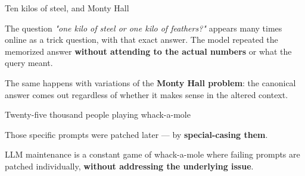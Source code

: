 \documentclass[aspectratio=169,11pt,t]{beamer}
\begin{document}
\begin{frame}[shrink=25]{Ten kilos of steel, and Monty Hall}
\begin{iquote}
\end{iquote}
{\fontsize{9.4}{12.6}\selectfont\color{fg2}The question \textit{"one kilo of steel or one kilo of feathers?"} appears many times online as a trick question, with that exact answer. The model repeated the memorized answer \textbf{without attending to the actual numbers} or what the query meant.\par}\vskip 4pt
{\fontsize{9.4}{12.6}\selectfont\color{fg2}The same happens with variations of the \textbf{Monty Hall problem}: the canonical answer comes out regardless of whether it makes sense in the altered context.\par}\vskip 4pt
\end{frame}

\begin{frame}[shrink=25]{Twenty-five thousand people playing whack-a-mole}
{\fontsize{9.4}{12.6}\selectfont\color{fg2}Those specific prompts were patched later --- by \textbf{special-casing them}.\par}\vskip 4pt
\begin{minipage}[t]{0.494\textwidth}
\end{minipage}%
\hfill
\begin{minipage}[t]{0.494\textwidth}
\end{minipage}%
\begin{iband}[rose]
LLM maintenance is a constant game of whack-a-mole where failing prompts are patched individually, \textbf{without addressing the underlying issue}. 
\end{iband}
\end{frame}
\end{document}

